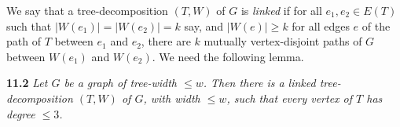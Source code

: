 We say that a tree-decomposition $(T, W)$ of $G$ is \textit{linked} if for all $e_1, e_2 \in E(T)$ such that $|W(e_1)| = |W(e_2)| = k$ say, and $|W(e)| \ge k$ for all edges $e$ of the path of $T$ between $e_1$ and $e_2$, there are $k$ mutually vertex-disjoint paths of $G$ between $W(e_1)$ and $W(e_2)$. We need the following lemma.

\textbf{11.2} \textit{Let $G$ be a graph of tree-width $\le w$. Then there is a linked tree-decomposition $(T, W)$ of $G$, with width $\le w$, such that every vertex of $T$ has degree $\le 3$.}
